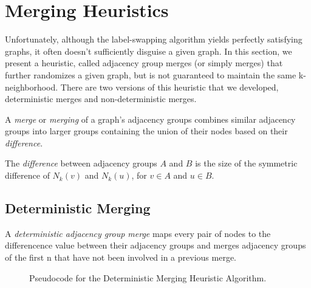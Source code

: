 \section{Merging Heuristics}
\indent Unfortunately, although the label-swapping algorithm yields perfectly satisfying graphs, it often doesn't sufficiently disguise a given graph.  In this section, we present a heuristic, called adjacency group merges (or simply merges) that further randomizes a given graph, but is not guaranteed to maintain the same k-neighborhood. There are two versions of this heuristic that we developed, deterministic merges and non-deterministic merges.

\begin{dfn}
\noindent A \emph{merge} or \emph{merging} of a graph's adjacency groups combines similar adjacency groups into larger groups containing the union of their nodes based on their \emph{difference}.
\end{dfn}

\begin{dfn}
The \emph{difference} between adjacency groups $A$ and $B$ is the size of the symmetric difference of $N_k(v)$ and $N_k(u)$, for $v \in A$ and $u \in B$. 
\end{dfn}

\subsection{Deterministic Merging}

\begin{dfn}
A \emph{deterministic adjacency group merge} maps every pair of nodes to  the differencence value between their adjacency groups and merges adjacency groups of the first n that have not been involved in a previous merge.
\end{dfn}

\begin{figure}[H]
	\begin{algorithmic}
		\renewcommand{\algorithmicrequire}{\textbf{Input:}}
		\renewcommand{\algorithmicensure}{\textbf{Output:}}
			\EndFor
		\EndFor
		\EndFor
			\EndIf
		\EndIf
	\end{algorithmic}
	\caption{Pseudocode for the Deterministic Merging Heuristic Algorithm.}
	\label{fig:deterministic-merging}
\end{figure}

